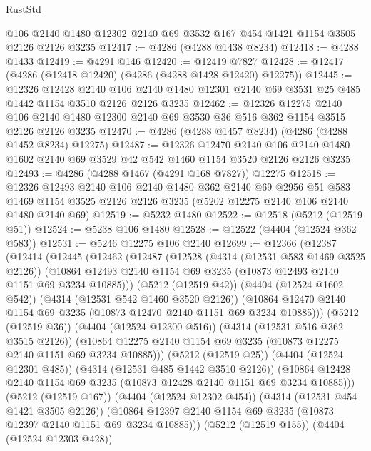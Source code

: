 \begin{lexlean}{RustStd}
\begin{coremodule}
    @106
    @2140
    @1480
    @12302
    @2140
    @69
    @3532
    @167
    @454
    @1421
    @1154
    @3505
    @2126
    @2126
    @3235
@12417 := @4286 (@4288 @1438 @8234)
@12418 := @4288 @1433
@12419 := @4291 @146
@12420 := @12419 @7827
@12428 := @12417 (@4286 (@12418 @12420) (@4286 (@4288 @1428 @12420) @12275))
@12445 := @12326
    @12428
    @2140
    @106
    @2140
    @1480
    @12301
    @2140
    @69
    @3531
    @25
    @485
    @1442
    @1154
    @3510
    @2126
    @2126
    @3235
@12462 := @12326
    @12275
    @2140
    @106
    @2140
    @1480
    @12300
    @2140
    @69
    @3530
    @36
    @516
    @362
    @1154
    @3515
    @2126
    @2126
    @3235
@12470 := @4286 (@4288 @1457 @8234) (@4286 (@4288 @1452 @8234) @12275)
@12487 := @12326
    @12470
    @2140
    @106
    @2140
    @1480
    @1602
    @2140
    @69
    @3529
    @42
    @542
    @1460
    @1154
    @3520
    @2126
    @2126
    @3235
@12493 := @4286 (@4288 @1467 (@4291 @168 @7827)) @12275
@12518 := @12326
    @12493
    @2140
    @106
    @2140
    @1480
    @362
    @2140
    @69
    @2956
    @51
    @583
    @1469
    @1154
    @3525
    @2126
    @2126
    @3235
    (@5202 @12275 @2140 @106 @2140 @1480 @2140 @69)
@12519 := @5232 @1480
@12522 := @12518 (@5212 (@12519 @51))
@12524 := @5238 @106 @1480
@12528 := @12522 (@4404 (@12524 @362 @583))
@12531 := @5246 @12275 @106 @2140
@12699 := @12366
    (@12387
      (@12414
        (@12445
          (@12462
            (@12487
              (@12528
                (@4314 (@12531 @583 @1469 @3525 @2126))
                (@10864 @12493 @2140 @1154 @69 @3235 (@10873 @12493 @2140 @1151 @69 @3234 @10885)))
              (@5212 (@12519 @42))
              (@4404 (@12524 @1602 @542))
              (@4314 (@12531 @542 @1460 @3520 @2126))
              (@10864 @12470 @2140 @1154 @69 @3235 (@10873 @12470 @2140 @1151 @69 @3234 @10885)))
            (@5212 (@12519 @36))
            (@4404 (@12524 @12300 @516))
            (@4314 (@12531 @516 @362 @3515 @2126))
            (@10864 @12275 @2140 @1154 @69 @3235 (@10873 @12275 @2140 @1151 @69 @3234 @10885)))
          (@5212 (@12519 @25))
          (@4404 (@12524 @12301 @485))
          (@4314 (@12531 @485 @1442 @3510 @2126))
          (@10864 @12428 @2140 @1154 @69 @3235 (@10873 @12428 @2140 @1151 @69 @3234 @10885)))
        (@5212 (@12519 @167))
        (@4404 (@12524 @12302 @454))
        (@4314 (@12531 @454 @1421 @3505 @2126))
        (@10864 @12397 @2140 @1154 @69 @3235 (@10873 @12397 @2140 @1151 @69 @3234 @10885)))
      (@5212 (@12519 @155))
      (@4404 (@12524 @12303 @428))

\end{coremodule}
\end{lexlean}
